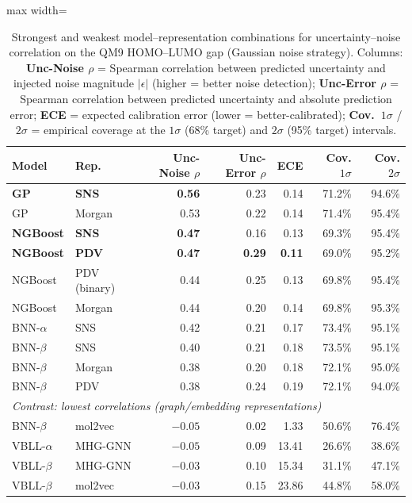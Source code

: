 \begin{table}[htbp]
\centering
\caption[Strongest and weakest combinations for uncertainty--noise correlation on QM9.]{Strongest and weakest model--representation combinations for uncertainty--noise correlation on the QM9 HOMO--LUMO gap (Gaussian noise strategy). Columns: \textbf{Unc-Noise $\rho$} = Spearman correlation between predicted uncertainty and injected noise magnitude $|\epsilon|$ (higher = better noise detection); \textbf{Unc-Error $\rho$} = Spearman correlation between predicted uncertainty and absolute prediction error; \textbf{ECE} = expected calibration error (lower = better-calibrated); \textbf{Cov.\ $1\sigma$} / \textbf{$2\sigma$} = empirical coverage at the $1\sigma$ (68\% target) and $2\sigma$ (95\% target) intervals.}
\label{tab:top_unc_noise}
\small
\begin{adjustbox}{max width=\textwidth}
\begin{tabular}{llrrrrr}
\toprule
\textbf{Model} & \textbf{Rep.} & \textbf{Unc-Noise $\rho$} & \textbf{Unc-Error $\rho$} & \textbf{ECE} & \textbf{Cov. $1\sigma$} & \textbf{Cov. $2\sigma$} \\
\midrule
\textbf{GP}    & \textbf{SNS}    & \textbf{0.56} & 0.23 & 0.14 & 71.2\% & 94.6\% \\
GP             & Morgan          & 0.53 & 0.22 & 0.14 & 71.4\% & 95.4\% \\
\textbf{NGBoost} & \textbf{SNS}  & \textbf{0.47} & 0.16 & 0.13 & 69.3\% & 95.4\% \\
\textbf{NGBoost} & \textbf{PDV}  & \textbf{0.47} & \textbf{0.29} & \textbf{0.11} & 69.0\% & 95.2\% \\
NGBoost        & PDV (binary)    & 0.44 & 0.25 & 0.13 & 69.8\% & 95.4\% \\
NGBoost        & Morgan          & 0.44 & 0.20 & 0.14 & 69.8\% & 95.3\% \\
BNN-$\alpha$   & SNS             & 0.42 & 0.21 & 0.17 & 73.4\% & 95.1\% \\
BNN-$\beta$    & SNS             & 0.40 & 0.21 & 0.18 & 73.5\% & 95.1\% \\
BNN-$\beta$    & Morgan          & 0.38 & 0.20 & 0.18 & 72.1\% & 95.0\% \\
BNN-$\beta$    & PDV             & 0.38 & 0.24 & 0.19 & 72.1\% & 94.0\% \\
\midrule
\multicolumn{7}{l}{\textit{Contrast: lowest correlations (graph/embedding representations)}} \\
\midrule
BNN-$\beta$ & mol2vec & $-0.05$ & 0.02 & 1.33 & 50.6\% & 76.4\% \\
VBLL-$\alpha$ & MHG-GNN & $-0.05$ & 0.09 & 13.41 & 26.6\% & 38.6\% \\
VBLL-$\beta$ & MHG-GNN & $-0.03$ & 0.10 & 15.34 & 31.1\% & 47.1\% \\
VBLL-$\beta$ & mol2vec & $-0.03$ & 0.15 & 23.86 & 44.8\% & 58.0\% \\
\bottomrule
\end{tabular}
\end{adjustbox}
\end{table}


